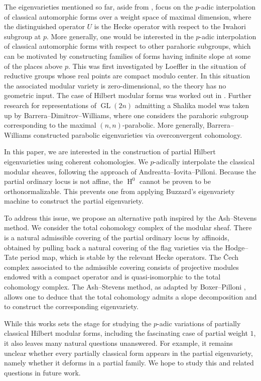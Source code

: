 \documentclass[11pt]{amsart}
\theoremstyle{definition} %
\theoremstyle{plain} %
\theoremstyle{remark} %
\DeclareMathOperator\GL{GL} %
\DeclareMathOperator\rH{H}
\begin{document}
The eigenvarieties mentioned so far, aside from \cite{BDJ}, focus on the $p$-adic interpolation of classical automorphic forms over a weight space of maximal dimension, where the distinguished operator $U$ is the Hecke operator with respect to the Iwahori subgroup at $p$. 
More generally, one would be interested in the $p$-adic interpolation of classical automorphic forms with respect to other parahoric subgroups, which can be motivated by constructing families of forms having infinite slope at some of the places above $p$. 
This was first investigated by Loeffler \cite{Loeff_oc} in the situation of reductive groups whose real points are compact modulo center. In this situation the associated modular variety is zero-dimensional, so the theory has no geometric input. The case of Hilbert modular forms was worked out in \cite{BDJ}. Further research 
for representations of  $\GL(2n)$ admitting a Shalika model was taken up by Barrera--Dimitrov--Williams, where one considers the parahoric subgroup corresponding to the maximal $(n,n)$-parabolic.  
More generally, Barrera--Williams \cite{BS-W} constructed parabolic eigenvarieties via overconvergent cohomology. 

In this paper, we are interested in the construction of partial Hilbert eigenvarieties using coherent cohomologies. 
We $p$-adically interpolate the classical modular sheaves, following the approach of Andreatta--Iovita--Pilloni.
Because the partial ordinary locus is not affine, the $\rH^0$ cannot be proven to be orthonormalizable.
This prevents one from applying Buzzard's eigenvariety machine to construct the partial eigenvariety.


To address this issue, we propose an alternative path inspired by the Ash--Stevens method.
We consider the total cohomology complex of the modular sheaf. 
There is a natural admissible covering of the partial ordinary locus by affinoids, obtained by pulling back a natural covering of the flag varieties via the Hodge--Tate period map,  which is stable by the relevant Hecke operators. 
The \v{C}ech complex associated to the admissible covering consists of projective modules endowed with a compact operator and is quasi-isomorphic to the total cohomology complex. The Ash--Stevens method, as adapted by Boxer--Pilloni \cite{BP}, allows one to
deduce that the total cohomology admits a slope decomposition and to  construct the corresponding eigenvariety. 

While this works sets the stage for studying the $p$-adic variations of partially classical Hilbert modular forms, including the fascinating  case of partial weight $1$, it also leaves many natural questions unanswered. For example, it 
remains unclear whether every partially classical form appears in the partial eigenvariety, namely whether it deforms in a partial family. We hope to study this and related questions in future work.
\end{document}
